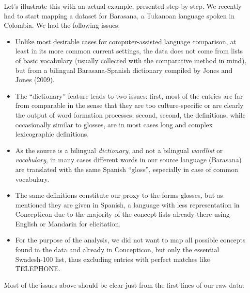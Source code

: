 \documentclass[
  a4paper,
  14pt,
  oneside,
  tablecaptionabove
]{scrbook}
\begin{document}
Let's illustrate this with an actual example, presented step-by-step. We
recently had to start mapping a dataset for Barasana, a Tukanoan
language spoken in Colombia. We had the following issues:

\begin{itemize}
\item Unlike most
desirable cases for computer-assisted language comparison, at least in
its more common current settings, the data does not come from lists of
basic vocabulary (usually collected with the comparative method in
mind), but from a bilingual Barasana-Spanish dictionary compiled by
Jones and Jones (2009).
\item The \enquote{dictionary} feature leads to two
issues: first, most of the entries are far from comparable in the sense
that they are too culture-specific or are clearly the output of word
formation processes; second, second, the definitions, while occasionally
similar to glosses, are in most cases long and complex lexicographic
definitions.
\item As the source is a bilingual \emph{dictionary}, and not a
bilingual \emph{wordlist} or \emph{vocabulary}, in many cases different
words in our source language (Barasana) are translated with the same
Spanish \enquote{gloss}, especially in case of common vocabulary.
\item The
same definitions constitute our proxy to the forms glosses, but as
mentioned they are given in Spanish, a language with less representation
in Concepticon due to the majority of the concept lists already there
using English or Mandarin for elicitation.
\item For the purpose of the
analysis, we did not want to map all possible concepts found in the data
and already in Concepticon, but only the essential Swadesh-100 list,
thus excluding entries with perfect matches like TELEPHONE.
\end{itemize}

Most of the issues above should be clear just from the first lines of
our raw data:
\end{document}
